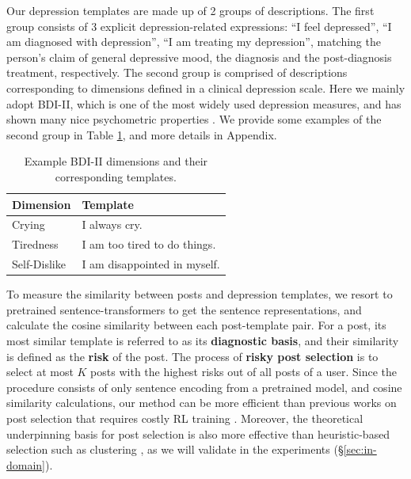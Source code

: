 Our depression templates are made up of 2 groups of descriptions. 
The first group consists of 3 explicit depression-related expressions: 
``I feel depressed'', ``I am diagnosed with depression'', 
``I am treating my depression'', matching the person's claim of 
general depressive mood, the diagnosis and the post-diagnosis treatment,
respectively. The second group is comprised of descriptions corresponding 
to dimensions defined in a clinical depression scale. 
Here we mainly adopt BDI-II, which is one of the most widely used depression 
measures, and has shown many nice psychometric properties \citep{beck1996beck}. 
We provide some examples of the second group in Table \ref{tab:template_example}, and more details in Appendix.

\begin{table}[h]
    \centering
    \begin{tabular}{l|l}
        \hline
        Dimension & Template \\
        \hline
        Crying & I always cry. \\
        Tiredness  & I am too tired to do things. \\
        Self-Dislike & I am disappointed in myself. \\
        \hline
    \end{tabular}
    \caption{Example BDI-II dimensions and their corresponding templates.}
    \label{tab:template_example}
\end{table}

To measure the similarity between posts and depression templates, we resort to pretrained sentence-transformers \citep{reimers-2019-sentence-bert} to get the sentence representations, and calculate the cosine similarity between each post-template pair. For a post, its most similar template is referred to as its \textbf{diagnostic basis}, and their similarity is defined as the \textbf{risk} of the post. The process of \textbf{risky post selection} is to select at most $K$ posts with the highest risks out of all posts of a user. Since the procedure consists of only sentence encoding from a pretrained model, and cosine similarity calculations, our method can be more efficient than previous works on post selection that requires costly RL training \citep{gui2019cooperative}. Moreover, the theoretical underpinning basis for post selection is also more effective than heuristic-based selection such as clustering \citep{zogan2021depressionnet}, as we will validate in the experiments (\S \ref{sec:in-domain}).

